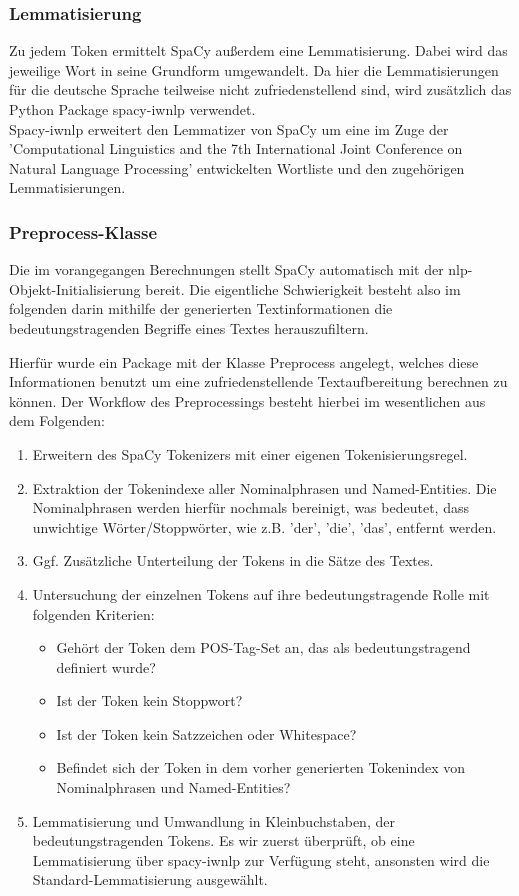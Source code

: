 \subsubsection{Lemmatisierung}
Zu jedem Token ermittelt SpaCy außerdem eine Lemmatisierung. Dabei wird das jeweilige Wort in seine Grundform umgewandelt. Da hier die Lemmatisierungen für die deutsche Sprache teilweise nicht zufriedenstellend sind, wird zusätzlich das Python Package spacy-iwnlp verwendet. 
\\Spacy-iwnlp erweitert den Lemmatizer von SpaCy um eine im Zuge der 'Computational Linguistics and the 7th International Joint Conference on Natural Language Processing' entwickelten Wortliste und den zugehörigen Lemmatisierungen. 

\subsubsection{Preprocess-Klasse}
Die im vorangegangen Berechnungen stellt SpaCy automatisch mit der nlp-Objekt-Initialisierung bereit. Die eigentliche Schwierigkeit besteht also im folgenden darin mithilfe der generierten Textinformationen die bedeutungstragenden Begriffe eines Textes herauszufiltern.

Hierfür wurde ein Package mit der Klasse Preprocess angelegt, welches diese Informationen benutzt um eine zufriedenstellende Textaufbereitung berechnen zu können.
Der Workflow des Preprocessings besteht hierbei im wesentlichen aus dem Folgenden:
\begin{enumerate}
\item Erweitern des SpaCy Tokenizers mit einer eigenen Tokenisierungsregel.
\item Extraktion der Tokenindexe aller Nominalphrasen und Named-Entities. Die Nominalphrasen werden hierfür nochmals bereinigt, was bedeutet, dass unwichtige Wörter/Stoppwörter, wie z.B. 'der', 'die', 'das', entfernt werden.
\item Ggf. Zusätzliche Unterteilung der Tokens in die Sätze des Textes.
\item Untersuchung der einzelnen Tokens auf ihre bedeutungstragende Rolle mit folgenden Kriterien:
\begin{itemize}
\item Gehört der Token dem POS-Tag-Set an, das als bedeutungstragend definiert wurde?
\item Ist der Token kein Stoppwort?
\item Ist der Token kein Satzzeichen oder Whitespace?
\item Befindet sich der Token in dem vorher generierten Tokenindex von Nominalphrasen und Named-Entities?
\end{itemize}
\item Lemmatisierung und Umwandlung in Kleinbuchstaben, der bedeutungstragenden Tokens. Es wir zuerst überprüft, ob eine Lemmatisierung über spacy-iwnlp zur Verfügung steht, ansonsten wird die Standard-Lemmatisierung ausgewählt.
\end{enumerate}

